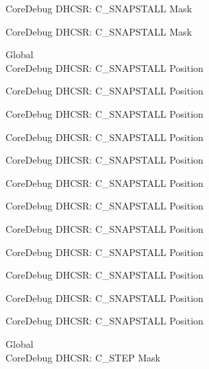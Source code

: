 \begin{DoxyRefList}
\label{deprecated__deprecated001161}%
%
Core\+Debug DHCSR\+: C\+\_\+\+SNAPSTALL Mask 

\label{deprecated__deprecated001263}%
%
Core\+Debug DHCSR\+: C\+\_\+\+SNAPSTALL Mask  
\item[Global \doxylink{group___c_m_s_i_s___core_debug_ga85747214e2656df6b05ec72e4d22bd6d}{Core\+Debug\+\_\+\+DHCSR\+\_\+\+C\+\_\+\+SNAPSTALL\+\_\+\+Pos} ]\hfill \\
\label{deprecated__deprecated000031}%
%
Core\+Debug DHCSR\+: C\+\_\+\+SNAPSTALL Position 

\label{deprecated__deprecated000175}%
%
Core\+Debug DHCSR\+: C\+\_\+\+SNAPSTALL Position 

\label{deprecated__deprecated000317}%
%
Core\+Debug DHCSR\+: C\+\_\+\+SNAPSTALL Position 

\label{deprecated__deprecated000393}%
%
Core\+Debug DHCSR\+: C\+\_\+\+SNAPSTALL Position 

\label{deprecated__deprecated000482}%
%
Core\+Debug DHCSR\+: C\+\_\+\+SNAPSTALL Position 

\label{deprecated__deprecated000584}%
%
Core\+Debug DHCSR\+: C\+\_\+\+SNAPSTALL Position 

\label{deprecated__deprecated000709}%
%
Core\+Debug DHCSR\+: C\+\_\+\+SNAPSTALL Position 

\label{deprecated__deprecated000853}%
%
Core\+Debug DHCSR\+: C\+\_\+\+SNAPSTALL Position 

\label{deprecated__deprecated000995}%
%
Core\+Debug DHCSR\+: C\+\_\+\+SNAPSTALL Position 

\label{deprecated__deprecated001071}%
%
Core\+Debug DHCSR\+: C\+\_\+\+SNAPSTALL Position 

\label{deprecated__deprecated001160}%
%
Core\+Debug DHCSR\+: C\+\_\+\+SNAPSTALL Position 

\label{deprecated__deprecated001262}%
%
Core\+Debug DHCSR\+: C\+\_\+\+SNAPSTALL Position  
\item[Global \doxylink{group___c_m_s_i_s___core_debug_gae6bda72fbd32cc5734ff3542170dc00d}{Core\+Debug\+\_\+\+DHCSR\+\_\+\+C\+\_\+\+STEP\+\_\+\+Msk} ]\hfill \\
\label{deprecated__deprecated000036}%
%
Core\+Debug DHCSR\+: C\+\_\+\+STEP Mask 


\end{DoxyRefList}
